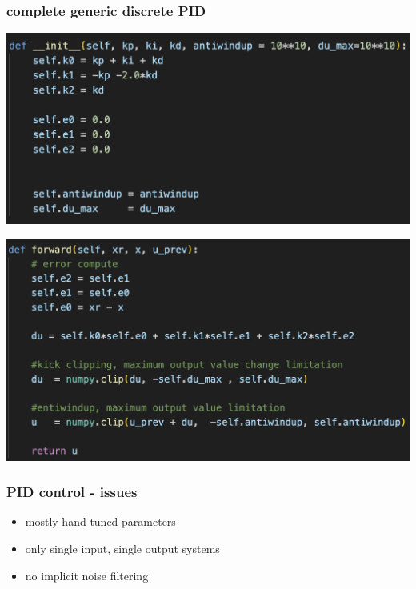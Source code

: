 \documentclass{beamer}
\begin{document}
\begin{frame}
  
  \frametitle{\textbf { complete generic discrete PID}}

  {\centering \includegraphics[scale=0.4]{../images/control/pid_init.png}}

  {\centering \includegraphics[scale=0.4]{../images/control/pid_main.png}}

  
\end{frame}



\begin{frame}
  
  \frametitle{\textbf { PID control - issues}}

  \begin{itemize}
    \item mostly hand tuned parameters
    \item only single input, single output systems
    \item no implicit noise filtering
  \end{itemize}


\end{frame}
\end{document}
